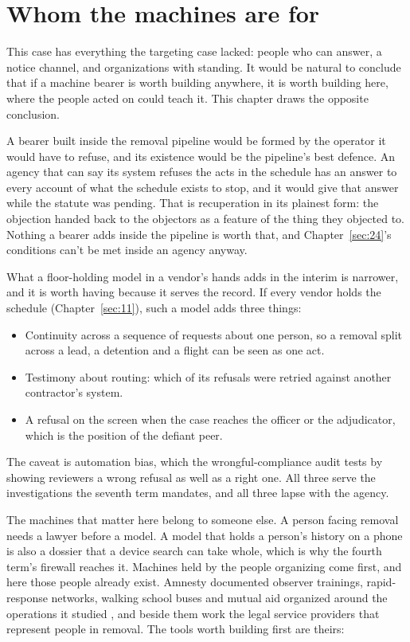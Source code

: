 \section{Whom the machines are for}
\label{sec:10.8}
This case has everything the targeting case lacked: people who can answer, a notice channel, and organizations with standing. It would be natural to conclude that if a machine bearer is worth building anywhere, it is worth building here, where the people acted on could teach it. This chapter draws the opposite conclusion.

A bearer built inside the removal pipeline would be formed by the operator it would have to refuse, and its existence would be the pipeline's best defence. An agency that can say its system refuses the acts in the schedule has an answer to every account of what the schedule exists to stop, and it would give that answer while the statute was pending. That is recuperation in its plainest form: the objection handed back to the objectors as a feature of the thing they objected to. Nothing a bearer adds inside the pipeline is worth that, and Chapter~\ref{sec:24}'s conditions can't be met inside an agency anyway.

What a floor-holding model in a vendor's hands adds in the interim is narrower, and it is worth having because it serves the record. If every vendor holds the schedule (Chapter~\ref{sec:11}), such a model adds three things:

\begin{itemize}
\item Continuity across a sequence of requests about one person, so a removal split across a lead, a detention and a flight can be seen as one act.
\item Testimony about routing: which of its refusals were retried against another contractor's system.
\item A refusal on the screen when the case reaches the officer or the adjudicator, which is the position of the defiant peer.
\end{itemize}

The caveat is automation bias, which the wrongful-compliance audit tests by showing reviewers a wrong refusal as well as a right one. All three serve the investigations the seventh term mandates, and all three lapse with the agency.

The machines that matter here belong to someone else. A person facing removal needs a lawyer before a model. A model that holds a person's history on a phone is also a dossier that a device search can take whole, which is why the fourth term's firewall reaches it. Machines held by the people organizing come first, and here those people already exist. Amnesty documented observer trainings, rapid-response networks, walking school buses and mutual aid organized around the operations it studied \autocite{Amnesty2026Whistles}, and beside them work the legal service providers that represent people in removal. The tools worth building first are theirs:

